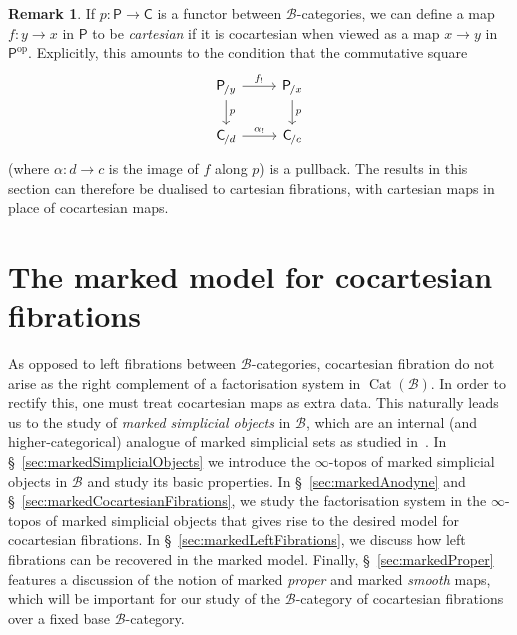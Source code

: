 \documentclass[reqno]{amsart}
\numberwithin{equation}{subsection}
\theoremstyle{plain}
\theoremstyle{definition}
\newtheorem{remark}[equation]{Remark}
\let\scr=\mathcal
\def\BB{\scr B}
\DeclareMathOperator{\Cat}{Cat}
\newcommand{\op}{\mathrm{op}}
\newcommand{\Over}[2]{#1_{\hspace{-1pt}/#2}}
\newcommand{\I}[1]{\mathsf{#1}}
\begin{document}
\begin{remark}
	\label{rem:cartesianMorphism}
	If $p\colon\I{P}\to\I{C}$ is a functor between $\BB$-categories, we can define a map $f\colon y\to x$ in $\I{P}$ to be \emph{cartesian} if it is cocartesian when viewed as a map $x\to y$ in $\I{P}^\op$. Explicitly, this amounts to the condition that the commutative square
	\begin{equation*}
	\begin{tikzcd}
	\Over{\I{P}}{y}\arrow[r, "f_!"]\arrow[d, "p"] & \Over{\I{P}}{x}\arrow[d, "p"]\\
	\Over{\I{C}}{d}\arrow[r, "\alpha_!"] & \Over{\I{C}}{c}
	\end{tikzcd}
	\end{equation*}
	(where $\alpha\colon d\to c$ is the image of $f$ along $p$) is a pullback. The results in this section can therefore be dualised to cartesian fibrations, with cartesian maps in place of cocartesian maps.
\end{remark}

\section{The marked model for cocartesian fibrations}
\label{sec:markedModel}
As opposed to left fibrations between $\BB$-categories, cocartesian fibration do not arise as the right complement of a factorisation system in $\Cat(\BB)$. In order to rectify this, one must treat cocartesian maps as extra data. This naturally leads us to the study of \emph{marked simplicial objects} in $\BB$, which are an internal (and higher-categorical) analogue of marked simplicial sets as studied in~\cite[\S~3.1]{htt}. In \S~\ref{sec:markedSimplicialObjects} we introduce the $\infty$-topos of marked simplicial objects in $\BB$ and study its basic properties. In \S~\ref{sec:markedAnodyne} and \S~\ref{sec:markedCocartesianFibrations}, we study the factorisation system in the $\infty$-topos of marked simplicial objects that gives rise to the desired model for cocartesian fibrations. In \S~\ref{sec:markedLeftFibrations}, we discuss how left fibrations can be recovered in the marked model. Finally, \S~\ref{sec:markedProper} features a discussion of the notion of marked \emph{proper} and marked \emph{smooth} maps, which will be important for our study of the $\BB$-category of cocartesian fibrations over a fixed base $\BB$-category.
\end{document}

